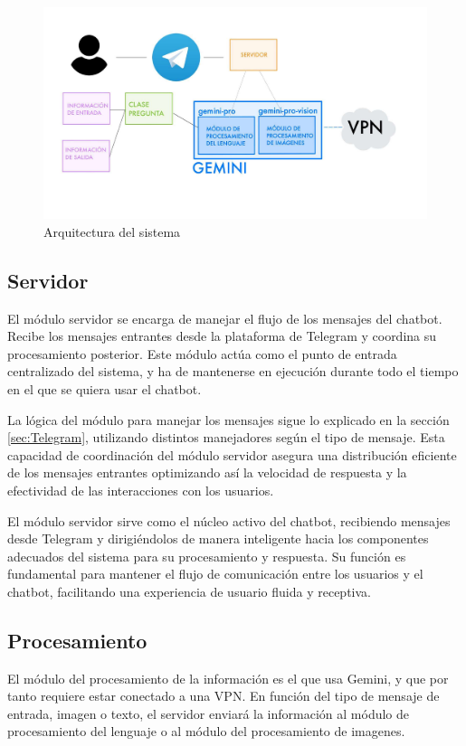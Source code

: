 \begin{figure}[h]
	\centering
	\includegraphics[width=1\textwidth]{Imagenes/arquitectura}
	\caption{Arquitectura del sistema}
	\label{fig:arquitectura}
\end{figure}

\subsection{Servidor}

El módulo servidor se encarga de manejar el flujo de los mensajes del chatbot. Recibe los mensajes entrantes desde la plataforma de Telegram y coordina su procesamiento posterior. Este módulo actúa como el punto de entrada centralizado del sistema, y ha de mantenerse en ejecución durante todo el tiempo en el que se quiera usar el chatbot.

La lógica del módulo para manejar los mensajes sigue lo explicado en la sección \ref{sec:Telegram}, utilizando distintos manejadores según el tipo de mensaje.  Esta capacidad de coordinación del módulo servidor asegura una distribución eficiente de los mensajes entrantes optimizando así la velocidad de respuesta y la efectividad de las interacciones con los usuarios. %

El módulo servidor sirve como el núcleo activo del chatbot, recibiendo mensajes desde Telegram y dirigiéndolos de manera inteligente hacia los componentes adecuados del sistema para su procesamiento y respuesta. Su función es fundamental para mantener el flujo de comunicación entre los usuarios y el chatbot, facilitando una experiencia de usuario fluida y receptiva. %

\subsection{Procesamiento}
El módulo del procesamiento de la información es el que usa Gemini, y que por tanto requiere estar conectado a una VPN. En función del tipo de mensaje de entrada, imagen o texto, el servidor enviará la información al módulo de procesamiento del lenguaje o al módulo del procesamiento de imagenes.
